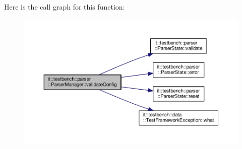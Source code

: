 Here is the call graph for this function\-:
\nopagebreak
\begin{figure}[H]
\begin{center}
\leavevmode
\includegraphics[width=350pt]{d2/d53/classit_1_1testbench_1_1parser_1_1ParserManager_a4b0eb91653f8393f199546e6d4b76a34_cgraph}
\end{center}
\end{figure}




